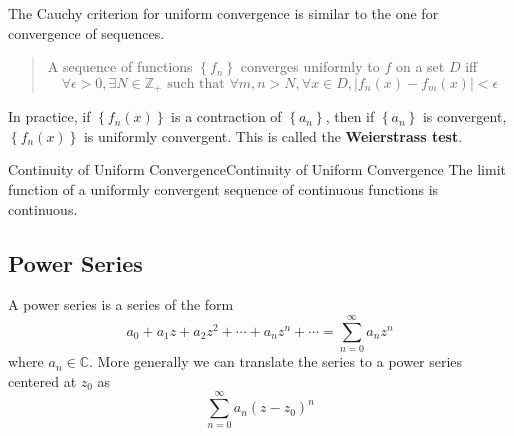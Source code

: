\documentclass[../main.tex]{subfiles}
\begin{document}
The Cauchy criterion for uniform convergence is similar to the one for convergence of sequences.

\begin{quote}
	A sequence of functions $\left\{ f_n \right\}$ converges uniformly to $f$ on a set $D$ iff
	\begin{equation*}
		\forall \epsilon>0, \exists N\in \mathbb{Z}_+ \text{ such that } \forall m,n>N, \forall x\in D, \left|f_n(x)-f_m(x)\right|<\epsilon
	\end{equation*}
\end{quote}

In practice, if $\left\{ f_n(x) \right\}$ is a contraction of $\left\{ a_n \right\}$, then if $\left\{ a_n \right\}$ is convergent, $\left\{ f_n(x) \right\}$ is uniformly convergent. This is called the \textbf{Weierstrass test}.

\begin{theorem}{Continuity of Uniform Convergence}{Continuity of Uniform Convergence}
The limit function of a uniformly convergent sequence of continuous functions is continuous.
\end{theorem}

\subsection{Power Series}
A power series is a series of the form
\begin{equation*}
	a_0 + a_1 z + a_2 z^2 + \cdots + a_n z^n + \cdots = \sum_{n=0}^{\infty } a_n z^n
\end{equation*}
where $a_n\in \mathbb{C}$. More generally we can translate the series to a power series centered at $z_0$ as
\begin{equation*}
	\sum_{n=0}^{\infty } a_n (z-z_0)^n
\end{equation*}
\end{document}
